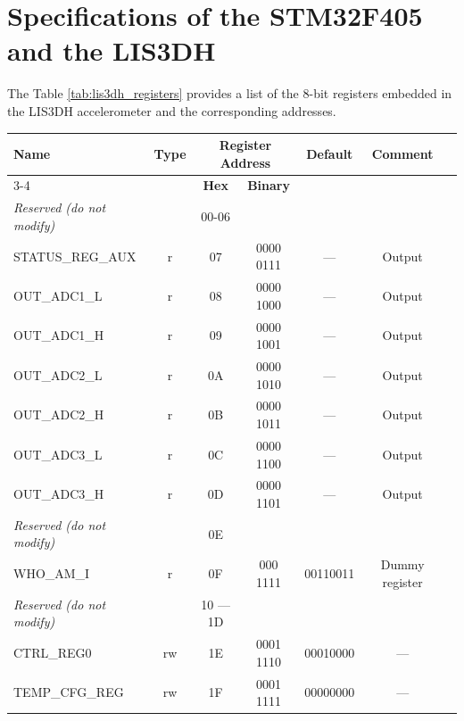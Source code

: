 \chapter{Specifications of the STM32F405 and the LIS3DH}
\label{ann:memories_maps}

The Table \ref{tab:lis3dh_registers} provides a list of the 8-bit registers embedded in the LIS3DH 
accelerometer and the corresponding addresses.

\begin{table}[H]
    \centering
    \footnotesize
    \setlength{\tabcolsep}{4pt}
    \renewcommand{\arraystretch}{0.9}
    \begin{tabular}{l c c c c c l}
        \toprule
        \textbf{Name} & \textbf{Type} & \multicolumn{2}{c}{\textbf{Register Address}} & \textbf{Default} & \textbf{Comment} \\
        \cmidrule(lr){3-4}
        & & \textbf{Hex} & \textbf{Binary} & & \\
        \midrule
        \textit{Reserved (do not modify)} & & 00-06 \\
        STATUS\_REG\_AUX    & r     & 07    & 0000 0111  & —         & Output    \\
        OUT\_ADC1\_L        & r     & 08    & 0000 1000  & —         & Output    \\
        OUT\_ADC1\_H        & r     & 09    & 0000 1001  & —         & Output    \\
        OUT\_ADC2\_L        & r     & 0A    & 0000 1010  & —         & Output    \\
        OUT\_ADC2\_H        & r     & 0B    & 0000 1011  & —         & Output    \\
        OUT\_ADC3\_L        & r     & 0C    & 0000 1100  & —         & Output    \\
        OUT\_ADC3\_H        & r     & 0D    & 0000 1101  & —         & Output    \\
        \textit{Reserved (do not modify)} & & 0E                                \\
        WHO\_AM\_I          & r & 0F & 000 1111 & 00110011 & Dummy register     \\
        \textit{Reserved (do not modify)} & & 10 — 1D                          \\
        CTRL\_REG0          & rw    & 1E    & 0001 1110  & 00010000  & —         \\
        TEMP\_CFG\_REG      & rw    & 1F    & 0001 1111  & 00000000  & —         \\

\end{tabular}
\end{table}
